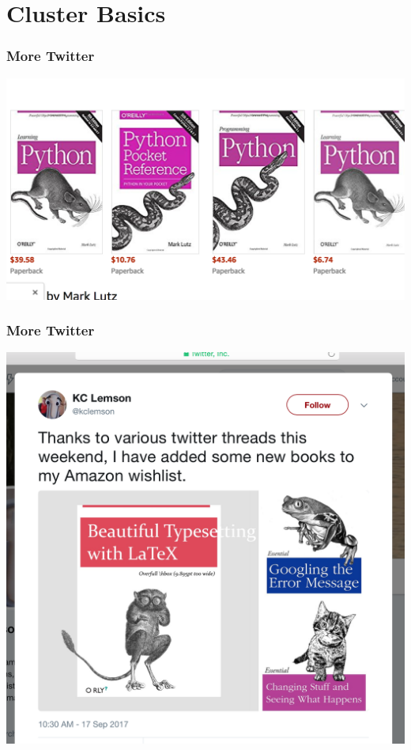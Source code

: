 \documentclass[14pt]{beamer}
\begin{document}
\section{Cluster Basics}

\begin{frame}
\frametitle{More Twitter}
	\begin{center}
     	\includegraphics[width=1\textwidth]{images_20170919_python.png}
    \end{center}
\end{frame}

\begin{frame}
\frametitle{More Twitter}
	\begin{center}
     	\includegraphics[width=.6\textwidth]{images_20170919_twitter.png}
    \end{center}
\end{frame}
\end{document}
